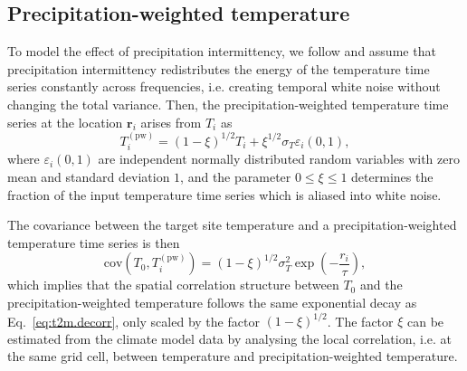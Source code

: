 \documentclass[cp, manuscript]{copernicus}
\begin{document}
\subsection{Precipitation-weighted temperature}
\label{app:concept.model.t2m.pw}

To model the effect of precipitation intermittency, we follow
\citet{Laepple2018} and assume that precipitation intermittency redistributes
the energy of the temperature time series constantly across frequencies,
i.e. creating temporal white noise without changing the total variance. Then,
the precipitation-weighted temperature time series at the location
$\mathbf{r}_i$ arises from $T_i$ as
%
\begin{equation}
\label{eq:precip.weighting}
T_i^{\mathrm{(pw)}}=
\left(1-\xi\right)^{1/2}T_i + \xi^{1/2} \sigma_T \varepsilon_i(0,1),
\end{equation}
%
where $\varepsilon_i(0,1)$ are independent normally distributed random variables
with zero mean and standard deviation $1$, and the parameter $0\leq\xi\leq1$
determines the fraction of the input temperature time series which is aliased
into white noise.

The covariance between the target site temperature and a precipitation-weighted
temperature time series is then
\begin{equation}
\label{eq:t2m.pw.decorr}
\mathrm{cov}(T_0,T_i^{\mathrm{(pw)}})=
(1-\xi)^{1/2}\sigma_T^2\exp{\left(-\frac{r_i}{\tau}\right)},
\end{equation}
%
which implies that the spatial correlation structure between $T_0$ and the
precipitation-weighted temperature follows the same exponential decay as
Eq.~\eqref{eq:t2m.decorr}, only scaled by the factor $(1-\xi)^{1/2}$. The factor
$\xi$ can be estimated from the climate model data by analysing the local
correlation, i.e. at the same grid cell, between temperature and
precipitation-weighted temperature.
\end{document}
